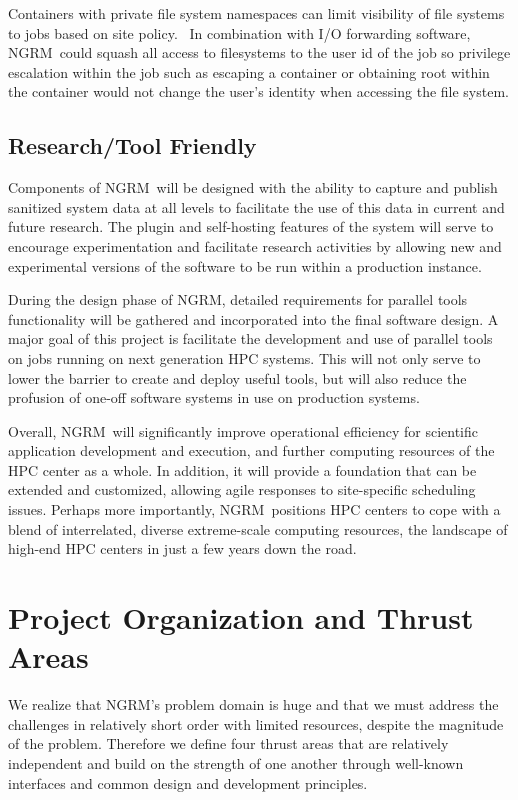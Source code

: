 \documentclass{article}
\newcommand{\ngrm}{NGRM}
\begin{document}
Containers with private file system namespaces can limit visibility of
file systems to jobs based on site policy.  In combination with I/O
forwarding software, \ngrm\ could squash all access to filesystems to
the user id of the job so privilege escalation within the job such as
escaping a container or obtaining root within the container would not
change the user’s identity when accessing the file system.

\subsection{Research/Tool Friendly}

Components of \ngrm\ will be designed with the ability to capture and
publish sanitized system data at all levels to facilitate the use of
this data in current and future research.  The plugin and self-hosting
features of the system will serve to encourage experimentation and
facilitate research activities by allowing new and experimental
versions of the software to be run within a production instance.

During the design phase of \ngrm , detailed requirements for parallel
tools functionality will be gathered and incorporated into the final
software design. A major goal of this project is facilitate the
development and use of parallel tools on jobs running on next
generation HPC systems. This will not only serve to lower the
barrier to create and deploy useful tools, but will also reduce the
profusion of one-off software systems in use on production systems.

Overall, \ngrm\ will significantly improve operational efficiency for
scientific application development and execution, and further computing
resources of the HPC center as a whole.  In addition, it will provide
a foundation that can be extended and customized, allowing agile responses
to site-specific scheduling issues. Perhaps more importantly, \ngrm\ 
positions HPC centers to cope with a blend of interrelated, diverse
extreme-scale computing resources, the landscape of high-end HPC centers
in just a few years down the road.


\section{Project Organization and Thrust Areas}
\label{sect:projorg}
We realize that \ngrm 's problem domain is huge and that we must address
the challenges in relatively short order with limited resources, despite
the magnitude of the problem.  Therefore we define four thrust areas
that are relatively independent and build on the strength of one
another through well-known interfaces and common design and development
principles.  
\end{document}
